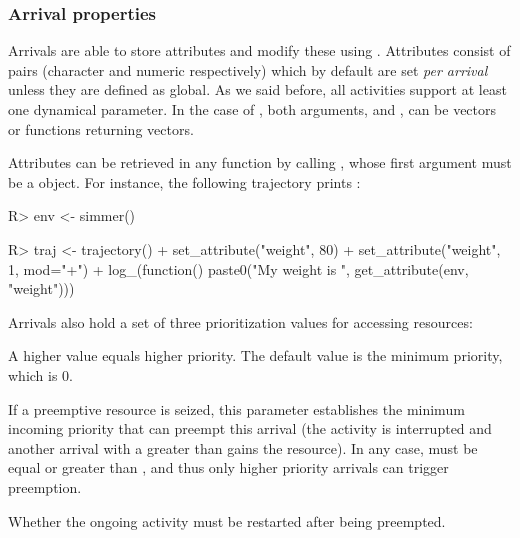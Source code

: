 \documentclass[
  nojss]{jss}
\providecommand{\tightlist}{%
  \setlength{\itemsep}{0pt}\setlength{\parskip}{0pt}}
\begin{document}
\hypertarget{arrival-properties}{%
\subsubsection{Arrival properties}\label{arrival-properties}}

Arrivals are able to store attributes and modify these using
. Attributes consist of pairs 
(character and numeric respectively) which by default are set \emph{per
arrival} unless they are defined as global. As we said before, all
activities support at least one dynamical parameter. In the case of
, both arguments,  and ,
can be vectors or functions returning vectors.

Attributes can be retrieved in any  function by calling
, whose first argument must be a 
object. For instance, the following trajectory prints :

\begin{CodeChunk}
\begin{CodeInput}
R> env <- simmer()
\end{CodeInput}
\end{CodeChunk}

\begin{CodeChunk}
\begin{CodeInput}
R> traj <- trajectory() %
+   set_attribute("weight", 80) %
+   set_attribute("weight", 1, mod="+") %
+   log_(function() paste0("My weight is ", get_attribute(env, "weight")))
\end{CodeInput}
\end{CodeChunk}

Arrivals also hold a set of three prioritization values for accessing
resources:

\begin{description}
\tightlist
\item[priority]
A higher value equals higher priority. The default value is the minimum
priority, which is 0.
\item[preemptible]
If a preemptive resource is seized, this parameter establishes the
minimum incoming priority that can preempt this arrival (the activity is
interrupted and another arrival with a  greater than
 gains the resource). In any case, 
must be equal or greater than , and thus only higher
priority arrivals can trigger preemption.
\item[restart]
Whether the ongoing activity must be restarted after being preempted.
\end{description}
\end{document}
